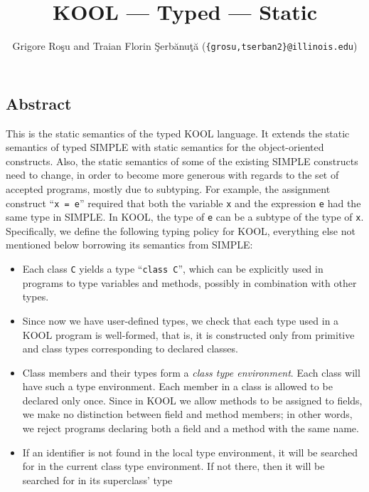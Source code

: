 \setlength{\parindent}{1em}
\title{KOOL --- Typed --- Static}
\author{Grigore Ro\c{s}u and 
        Traian Florin \c{S}erb\u{a}nu\c{t}\u{a}
        (\texttt{\{grosu,tserban2\}@illinois.edu})}

\maketitle

\begin{kblock}[text]
\section{Abstract}
This is the \K static semantics of the typed KOOL language.
It extends the static semantics of typed SIMPLE with static semantics
for the object-oriented constructs.  Also, the static semantics of
some of the existing SIMPLE constructs need to change, in order to
become more generous with regards to the set of accepted programs,
mostly due to subtyping.  For example, the assignment construct
``\texttt{x = e}'' required that both the variable \texttt{x} and the
expression \texttt{e} had the same type in SIMPLE\@.  In KOOL, the type
of \texttt{e} can be a subtype of the type of \texttt{x}.
Specifically, we define the following typing policy for KOOL,
everything else not mentioned below borrowing its semantics from
SIMPLE:
\begin{itemize}
\item Each class \texttt{C} yields a type ``\texttt{class C}'', which
can be explicitly used in programs to type variables and methods,
possibly in combination with other types.
\item Since now we have user-defined types, we check that each type
used in a KOOL program is well-formed, that is, it is constructed only
from primitive and class types corresponding to declared classes.
\item Class members and their types form a {\em class type
environment}.  Each class will have such a type environment.
Each member in a class is allowed to be declared only once.  Since in
KOOL we allow methods to be assigned to fields, we make no distinction
between field and method members; in other words, we reject programs
declaring both a field and a method with the same name.
\item If an identifier is not found in the local type environment, it
will be searched for in the current class type environment.  If not
there, then it will be searched for in its superclass' type

\end{itemize}
\end{kblock}
